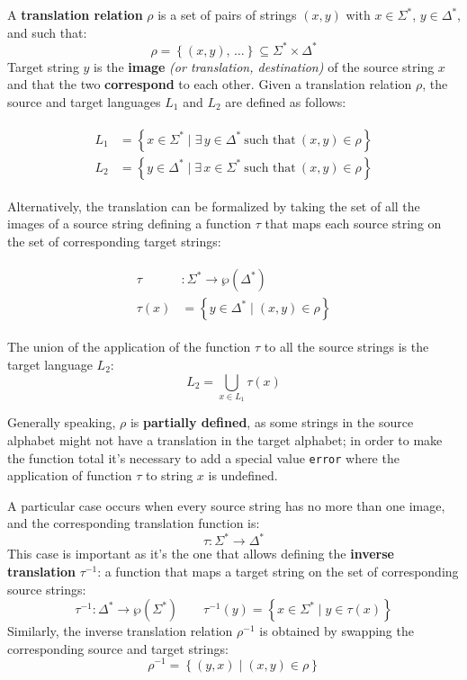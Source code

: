 \documentclass[english]{article}
\begin{document}
A \textbf{translation relation} \(\rho\) is a set of pairs of strings \(\left( x, y \right)\) with \(x \in \Sigma^\ast\), \(y \in \Delta^\ast\), and such that:
\[ \rho = \left\{ \left( x, y \right), \, \ldots \right\} \subseteq \Sigma^\ast \times \Delta^\ast \]
Target string \(y\) is the \textbf{image} \textit{(or translation, destination)} of the source string \(x\) and that the two \textbf{correspond} to each other.
Given a translation relation \(\rho\), the source and target languages \(L_1\) and \(L_2\) are defined as follows:

\begin{gather*}
  \begin{aligned}
    L_1 & = \left\{ x \in \Sigma^\ast \mid \exists\, y \in \Delta^\ast \ \text{such that} \ \left( x, y \right) \in \rho \right\} \\
    L_2 & = \left\{ y \in \Delta^\ast \mid \exists\, x \in \Sigma^\ast \ \text{such that} \ \left( x, y \right) \in \rho \right\}
  \end{aligned}
\end{gather*}

Alternatively, the translation can be formalized by taking the set of all the images of a source string defining a function \(\tau\) that maps each source string on the set of corresponding target strings:

\begin{gather*}
  \begin{aligned}
    \tau    & : \Sigma^\ast \rightarrow \wp \left( \Delta^\ast \right)               \\
    \tau(x) & = \left\{ y \in \Delta^\ast \mid \left( x, y \right) \in \rho \right\}
  \end{aligned}
\end{gather*}

The union of the application of the function \(\tau\) to all the source strings is the target language \(L_2\):
\[ L_2 = \bigcup_{x \in L_1} \tau(x) \]

Generally speaking, \(\rho\) is \textbf{partially defined}, as some strings in the source alphabet might not have a translation in the target alphabet;
in order to make the function total it's necessary to add a special value \texttt{error} where the application of function \(\tau\) to string \(x\) is undefined.

A particular case occurs when every source string has no more than one image, and the corresponding translation function is:
\[ \tau : \Sigma^\ast \rightarrow \Delta^\ast \]
This case is important as it's the one that allows defining the \textbf{inverse translation} \(\tau^{-1}\):
a function that maps a target string on the set of corresponding source strings:
\[ \tau^{-1} : \Delta^\ast \rightarrow \wp\left( \Sigma^\ast \right) \qquad \tau^{-1}(y) = \left\{ x \in \Sigma^\ast \mid y \in \tau(x) \right\} \]
Similarly, the inverse translation relation \(\rho^{-1}\) is obtained by swapping the corresponding source and target strings:
\[ \rho^{-1} = \left\{ \left( y, x \right) \mid \left( x, y \right) \in \rho \right\} \]
\end{document}
